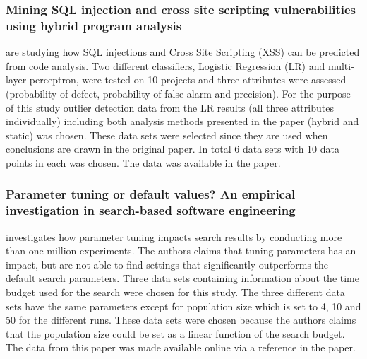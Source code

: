 \subsubsection{Mining SQL injection and cross site scripting vulnerabilities using hybrid program analysis}
\citet{shar2013mining} are studying how SQL injections and Cross Site Scripting (XSS) can be predicted from code analysis. Two different classifiers, Logistic Regression (LR) and multi-layer perceptron, were tested on 10 projects and three attributes were assessed (probability of defect, probability of false alarm and precision). For the purpose of this study outlier detection data from the LR results (all three attributes individually) including both analysis methods presented in the paper (hybrid and static) was chosen. These data sets were selected since they are used when conclusions are drawn in the original paper. In total 6 data sets with 10 data points in each was chosen. The data was available in the paper.




\subsubsection{Parameter tuning or default values? An empirical investigation in search-based software engineering}
\citet{arcuri2013parameter} investigates how parameter tuning impacts search results by conducting more than one million experiments. The authors claims that tuning parameters has an impact, but are not able to find settings that significantly outperforms the default search parameters. Three data sets containing information about the time budget used for the search were chosen for this study. The three different data sets have the same parameters except for population size which is set to 4, 10 and 50 for the different runs.  These data sets were chosen because the authors claims that the population size could be set as a linear function of the search budget. The data from this paper was made available online via a reference in the paper.




